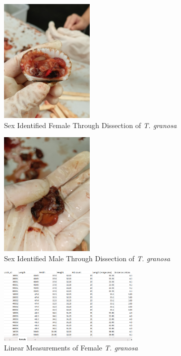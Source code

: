 \begin{figure}[!htbp]
	\centering
	\includegraphics[width=0.4\textwidth, angle=90]{figures/dissecting_female.jpg}
	\caption{Sex Identified Female Through Dissection of \textit{T. granosa}}
\end{figure}

\begin{figure}[!htbp]
	\centering
	\includegraphics[width=0.4\textwidth, angle=90]{figures/dissecting male.jpg}
	\caption{Sex Identified Male Through Dissection of \textit{T. granosa}}
\end{figure}

\begin{figure}[!htbp]
	\centering
	\includegraphics[width=0.6\textwidth]{figures/female_dataset.png}
	\caption{Linear Measurements of Female \textit{T. granosa}}
\end{figure}


